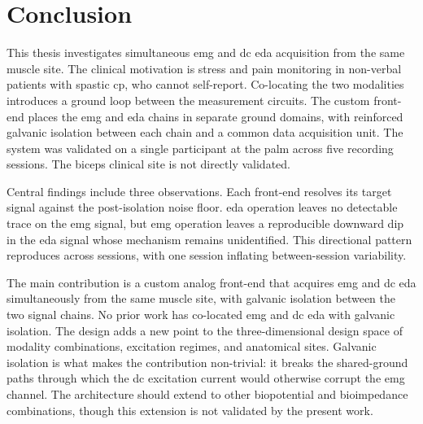 \chapter{Conclusion}
\label{ch:conclusion}

This thesis investigates simultaneous \gls{emg} and \gls{dc} \gls{eda} acquisition from the same muscle site. The clinical motivation is stress and pain monitoring in non-verbal patients with spastic \gls{cp}, who cannot self-report. Co-locating the two modalities introduces a ground loop between the measurement circuits. The custom front-end places the \gls{emg} and \gls{eda} chains in separate ground domains, with reinforced galvanic isolation between each chain and a common data acquisition unit. The system was validated on a single participant at the palm across five recording sessions. The biceps clinical site is not directly validated.

Central findings include three observations. Each front-end resolves its target signal against the post-isolation noise floor. \gls{eda} operation leaves no detectable trace on the \gls{emg} signal, but \gls{emg} operation leaves a reproducible downward dip in the \gls{eda} signal whose mechanism remains unidentified. This directional pattern reproduces across sessions, with one session inflating between-session variability.

The main contribution is a custom analog front-end that acquires \gls{emg} and \gls{dc} \gls{eda} simultaneously from the same muscle site, with galvanic isolation between the two signal chains. No prior work has co-located \gls{emg} and \gls{dc} \gls{eda} with galvanic isolation. The design adds a new point to the three-dimensional design space of modality combinations, excitation regimes, and anatomical sites. Galvanic isolation is what makes the contribution non-trivial: it breaks the shared-ground paths through which the \gls{dc} excitation current would otherwise corrupt the \gls{emg} channel. The architecture should extend to other biopotential and bioimpedance combinations, though this extension is not validated by the present work.

